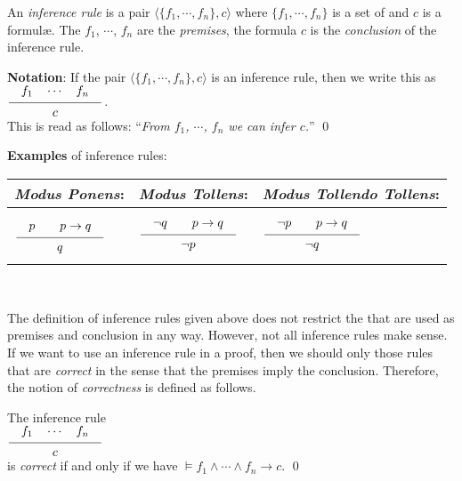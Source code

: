 \begin{Definition}
An  \emph{inference rule} is a pair  $\langle \{f_1, \cdots, f_n\}, c \rangle$ where
$\{f_1, \cdots, f_n\}$ is a set of \formulae and $c$ is a formul\ae. 
The \formulae $f_1$, $\cdots$, $f_n$ are the
\emph{premises}, the formula $c$ is the \emph{conclusion} of the inference rule.

\noindent
\textbf{Notation}:
If the pair 
$\langle \{f_1, \cdots, f_n\}, c \rangle$ is an inference rule, then we write this as
\\[0.3cm]
\hspace*{1.3cm}      
$\schluss{f_1 \quad \cdots \quad f_n}{c}$.
\\[0.3cm]
This is read as follows: 
``\emph{From $f_1$, $\cdots$, $f_n$ we can infer $c$.}''
\qed
\end{Definition}
\vspace*{0.3cm}

\noindent
\textbf{Examples} of inference rules: 
\\[0.2cm]
\hspace*{1.3cm}            
\begin{tabular}[t]{|l|l|l|}
\hline
\rule{0pt}{15pt} \emph{Modus Ponens}: & \emph{Modus Tollens}: & \emph{Modus Tollendo Tollens}: \\[0.3cm]
\hline
$
\rule[-15pt]{0pt}{40pt}\schluss{p \quad\quad p \rightarrow q}{q}$ &
$\schluss{\neg q \quad\quad p \rightarrow q}{\neg p}$ &
$\schluss{\neg p \quad\quad p \rightarrow q}{\neg q}$ \\[0.3cm]
\hline
\end{tabular}
\\[0.3cm]

\noindent

The definition of inference rules given above does not restrict the \formulae 
that are used as premises and conclusion in any way.  However, not all inference rules
make sense.  If we want to use an inference rule in a proof, then we should only those
rules that are \emph{correct} in the sense that the premises imply the conclusion.  
Therefore, the notion of \emph{correctness} is defined as follows.

\begin{Definition}[Correct]
The inference rule
\\[0.2cm]
\hspace*{1.3cm}
$\schluss{f_1 \quad \cdots \quad f_n}{c}$
\\[0.2cm]
is \emph{correct} if and only if we have
     $\models f_1 \wedge \cdots \wedge f_n \rightarrow c$. 
\qed
\end{Definition}

